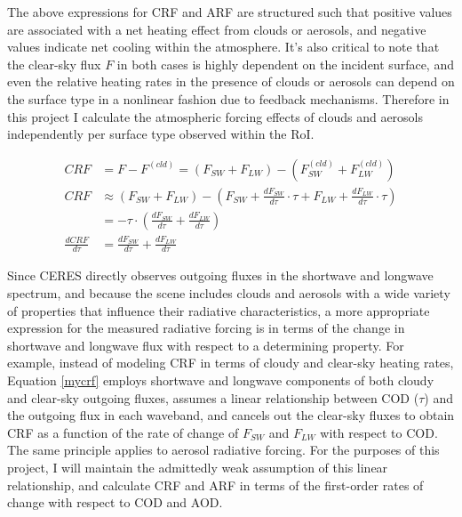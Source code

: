 \documentclass[12pt]{article}
\begin{document}
    The above expressions for CRF and ARF are structured such that positive values are associated with a net heating effect from clouds or aerosols, and negative values indicate net cooling within the atmosphere. It's also critical to note that the clear-sky flux $F$ in both cases is highly dependent on the incident surface, and even the relative heating rates in the presence of clouds or aerosols can depend on the surface type in a nonlinear fashion due to feedback mechanisms. Therefore in this project I calculate the atmospheric forcing effects of clouds and aerosols independently per surface type observed within the RoI.

    \begin{equation}\label{mycrf}
        \begin{split}
            CRF &=  F - F^{(cld)} = (F_{SW}+F_{LW}) - (F_{SW}^{(cld)} + F_{LW}^{(cld)}) \\
            CRF &\approx (F_{SW}+F_{LW}) - \left(F_{SW} + \frac{dF_{SW}}{d\tau}\cdot \tau + F_{LW} + \frac{dF_{LW}}{d\tau} \cdot \tau\right) \\
            &= -\tau \cdot \left(\frac{dF_{SW}}{d\tau} + \frac{dF_{LW}}{d\tau}\right)\\
            \frac{dCRF}{d\tau} &= \frac{dF_{SW}}{d\tau} + \frac{dF_{LW}}{d\tau}
        \end{split}
    \end{equation}

    Since CERES directly observes outgoing fluxes in the shortwave and longwave spectrum, and because the scene includes clouds and aerosols with a wide variety of properties that influence their radiative characteristics, a more appropriate expression for the measured radiative forcing is in terms of the change in shortwave and longwave flux with respect to a determining property. For example, instead of modeling CRF in terms of cloudy and clear-sky heating rates, Equation \ref{mycrf} employs shortwave and longwave components of both cloudy and clear-sky outgoing fluxes, assumes a linear relationship between COD ($\tau$) and the outgoing flux in each waveband, and cancels out the clear-sky fluxes to obtain CRF as a function of the rate of change of $F_{SW}$ and $F_{LW}$ with respect to COD. The same principle applies to aerosol radiative forcing. For the purposes of this project, I will maintain the admittedly weak assumption of this linear relationship, and calculate CRF and ARF in terms of the first-order rates of change with respect to COD and AOD.
\end{document}
